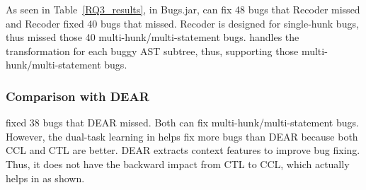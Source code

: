 As seen in Table~\ref{RQ3_results}, in Bugs.jar, {\tool} can fix 48
bugs that Recoder missed and Recoder fixed 40 bugs that {\tool}
missed. Recoder is designed for single-hunk bugs, thus missed those 40
multi-hunk/multi-statement bugs. {\tool} handles the transformation
for each buggy AST subtree, thus, supporting those
multi-hunk/multi-statement bugs.

\subsubsection{\bf Comparison with DEAR}
{\tool} fixed 38 bugs that DEAR missed. Both can fix
multi-hunk/multi-statement bugs. However, the dual-task learning in
{\tool} helps fix more bugs than DEAR because both CCL and CTL are
better. DEAR extracts context features to improve bug fixing. Thus, it
does not have the backward impact from CTL to CCL, which actually
helps in {\tool} as shown.
